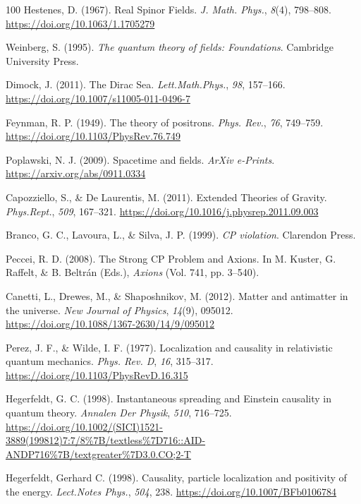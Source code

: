 \documentclass[11pt]{book}
\begin{document}
\begin{thebibliography}{100}
 Hestenes, D. (1967). Real Spinor Fields. \emph{J. Math. Phys.},
\emph{8}(4), 798--808. \url{https://doi.org/10.1063/1.1705279}

 Weinberg, S. (1995). \emph{The quantum theory of fields: Foundations}.
Cambridge University Press.

 Dimock, J. (2011). The Dirac Sea. \emph{Lett.Math.Phys.}, \emph{98},
157--166. \url{https://doi.org/10.1007/s11005-011-0496-7}

 Feynman, R. P. (1949). The theory of positrons. \emph{Phys. Rev.},
\emph{76}, 749--759. \url{https://doi.org/10.1103/PhysRev.76.749}

 Poplawski, N. J. (2009). Spacetime and fields. \emph{ArXiv e-Prints}.
\url{https://arxiv.org/abs/0911.0334}

 Capozziello, S., \& De Laurentis, M. (2011). Extended Theories of
Gravity. \emph{Phys.Rept.}, \emph{509}, 167--321.
\url{https://doi.org/10.1016/j.physrep.2011.09.003}

 Branco, G. C., Lavoura, L., \& Silva, J. P. (1999). \emph{CP violation}.
Clarendon Press.

 Peccei, R. D. (2008). The Strong CP Problem and Axions. In M. Kuster, G.
Raffelt, \& B. Beltrán (Eds.), \emph{Axions} (Vol. 741, pp. 3--540).

 Canetti, L., Drewes, M., \& Shaposhnikov, M. (2012). Matter and
antimatter in the universe. \emph{New Journal of Physics}, \emph{14}(9),
095012. \url{https://doi.org/10.1088/1367-2630/14/9/095012}

 Perez, J. F., \& Wilde, I. F. (1977). Localization and causality in
relativistic quantum mechanics. \emph{Phys. Rev. D}, \emph{16},
315--317. \url{https://doi.org/10.1103/PhysRevD.16.315}

 Hegerfeldt, G. C. (1998). Instantaneous spreading and Einstein causality
in quantum theory. \emph{Annalen Der Physik}, \emph{510}, 716--725.
\url{https://doi.org/10.1002/(SICI)1521-3889(199812)7:7/8\%7B/textless\%7D716::AID-ANDP716\%7B/textgreater\%7D3.0.CO;2-T}

 Hegerfeldt, Gerhard C. (1998). Causality, particle localization and
positivity of the energy. \emph{Lect.Notes Phys.}, \emph{504}, 238.
\url{https://doi.org/10.1007/BFb0106784}


\end{thebibliography}
\end{document}
